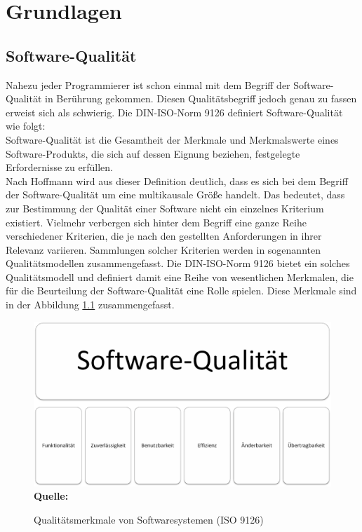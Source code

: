 \chapter{Grundlagen}
\label{sec:grundlagen}


\section{Software-Qualität}
\label{sec:softwarequalität}

Nahezu jeder Programmierer ist schon einmal mit dem Begriff der Software-Qualität in Berührung gekommen. Diesen Qualitätsbegriff jedoch genau zu fassen erweist sich als schwierig.
Die DIN-ISO-Norm 9126 definiert Software-Qualität wie folgt:
\\
\glqq Software-Qualität ist die Gesamtheit der Merkmale und Merkmalswerte eines Software-Produkts, die sich auf dessen Eignung beziehen, festgelegte Erfordernisse zu erfüllen.\grqq \cite{iso/iec_iso/iec_2001}
\\
Nach Hoffmann \cite[vgl. S.6 ff.]{hoffmann_software-qualitat_2013} wird aus dieser Definition deutlich, dass es sich bei dem Begriff der Software-Qualität um eine multikausale Größe handelt. Das bedeutet, dass zur Bestimmung der Qualität einer Software nicht ein einzelnes Kriterium existiert. Vielmehr verbergen sich hinter dem Begriff eine ganze Reihe verschiedener Kriterien, die je nach den gestellten Anforderungen in ihrer Relevanz variieren.
Sammlungen solcher Kriterien werden in sogenannten Qualitätsmodellen zusammengefasst. Die DIN-ISO-Norm 9126 \cite{iso/iec_iso/iec_2001} bietet ein solches Qualitätsmodell und definiert damit eine Reihe von wesentlichen Merkmalen, die für die Beurteilung der Software-Qualität eine Rolle spielen. Diese Merkmale sind in der Abbildung \ref{fig:qualitaetsmerkmaleVonSoftwaresystemen} zusammengefasst.
\begin{figure}[htb]
  \centering  
  \includegraphics[scale=0.6]{img/softwarequalitaet9126.png}\\
  \footnotesize\sffamily\textbf{Quelle:} \cite{iso/iec_iso/iec_2001}
  \caption{Qualitätsmerkmale von Softwaresystemen (ISO 9126)}
  \label{fig:qualitaetsmerkmaleVonSoftwaresystemen}
\end{figure}
